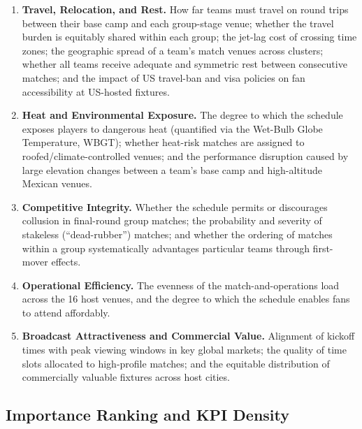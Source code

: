 \documentclass[12pt, letterpaper]{article}
\begin{document}
\begin{enumerate}[leftmargin=*, label=\textbf{C\arabic*.}, itemsep=6pt]

  \item \textbf{Travel, Relocation, and Rest.}
        How far teams must travel on round trips between their base camp
        and each group-stage venue; whether the travel burden is equitably
        shared within each group; the jet-lag cost of crossing time zones;
        the geographic spread of a team's match venues across clusters;
        whether all teams receive adequate and symmetric rest between
        consecutive matches; and the impact of US travel-ban and visa
        policies on fan accessibility at US-hosted fixtures.

  \item \textbf{Heat and Environmental Exposure.}
        The degree to which the schedule exposes players to dangerous heat
        (quantified via the Wet-Bulb Globe Temperature, WBGT); whether
        heat-risk matches are assigned to roofed/climate-controlled venues;
        and the performance disruption caused by large elevation changes
        between a team's base camp and high-altitude Mexican venues.

  \item \textbf{Competitive Integrity.}
        Whether the schedule permits or discourages collusion in final-round
        group matches; the probability and severity of stakeless
        (``dead-rubber'') matches; and whether the ordering of matches within
        a group systematically advantages particular teams through first-mover
        effects.

  \item \textbf{Operational Efficiency.}
        The evenness of the match-and-operations load across the 16 host
        venues, and the degree to which the schedule enables fans to attend
        affordably.

  \item \textbf{Broadcast Attractiveness and Commercial Value.}
        Alignment of kickoff times with peak viewing windows in key global
        markets; the quality of time slots allocated to high-profile matches;
        and the equitable distribution of commercially valuable fixtures
        across host cities.

\end{enumerate}

\subsection{Importance Ranking and KPI Density}
\label{sec:ranking}
\end{document}
